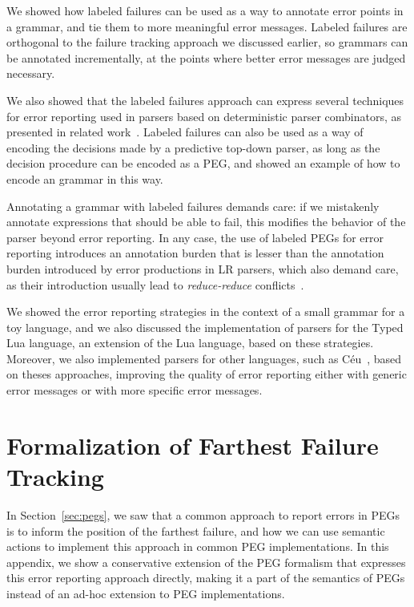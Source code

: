 \documentclass[3p,12pt,singlecolumn]{elsarticle}
\begin{document}
We showed how labeled failures can be used as a way to
annotate error points in a grammar, and tie them to more
meaningful error messages. Labeled failures are orthogonal
to the failure tracking approach we discussed earlier, so
grammars can be annotated incrementally, at the points
where better error messages are judged necessary.

We also showed that the labeled failures approach can express
several techniques for error reporting used in parsers
based on deterministic parser combinators, as
presented in related
work~\cite{hutton1992hfp,rojemo1995epc,partridge1996fv,leijen2001parsec}.
Labeled failures can also be used as a way of encoding 
the decisions made by a predictive top-down parser, as long
as the decision procedure can be encoded as a PEG, and showed
an example of how to encode an  grammar in this way.

Annotating a grammar with labeled failures demands care:
if we mistakenly annotate expressions that should be able to
fail, this modifies the behavior of the parser beyond error 
reporting. In any case, the use of labeled PEGs for error
reporting introduces an annotation burden that is
lesser than the annotation burden introduced by error
productions in LR parsers, which also demand care, as
their introduction usually lead to \textit{reduce-reduce}
conflicts~\cite{jeffery2003lre}.

We showed the error reporting strategies in the context
of a small grammar for a toy language, and we also discussed
the implementation of parsers for the Typed Lua language,
an extension of the Lua language, based on these strategies.
Moreover, we also implemented parsers for other languages,
such as Céu~\cite{ceu}, based on theses approaches,
improving the quality of error reporting either with
generic error messages or with more specific error messages.





\appendix
\clearpage{}\appendix
\section{Formalization of Farthest Failure Tracking}
\label{sec:semfarther}

In Section~\ref{sec:pegs}, we saw that a common approach
to report errors in PEGs is to inform the position of the
farthest failure,
and how we can use semantic actions to implement
this approach in common PEG implementations. In this appendix,
we show a conservative extension of the PEG formalism
that expresses this error reporting approach directly,
making it a part of the semantics of PEGs instead of an
ad-hoc extension to PEG implementations.
\end{document}
